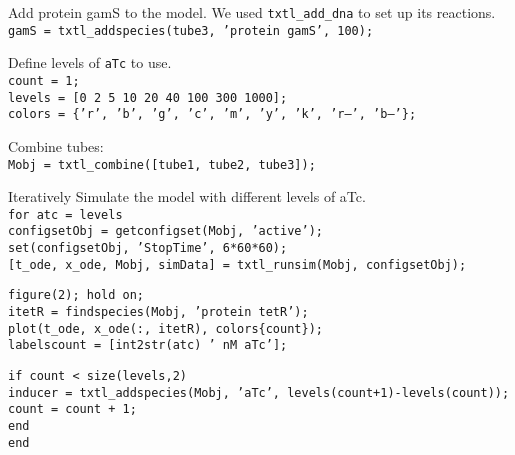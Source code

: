 		Add protein gamS to the model. We used \texttt{txtl\_add\_dna} to set up its reactions. \\
		
		\noindent \texttt{gamS = txtl\_addspecies(tube3, 'protein gamS', 100);}
\vspace*{1\baselineskip}
				
		Define levels of \texttt{aTc} to use. \\						
\noindent \texttt{count = 1;}\\
\texttt{levels = [0 2 5 10 20 40 100 300 1000];}\\
\texttt{colors = \{'r', 'b', 'g', 'c', 'm', 'y', 'k', 'r--', 'b--'\};}
\vspace*{1\baselineskip}
								
		Combine tubes: \\						
\noindent \texttt{Mobj = txtl\_combine([tube1, tube2, tube3]);}
\vspace*{1\baselineskip}
								
		Iteratively Simulate the model with different levels of aTc. \\						
\noindent \texttt{for atc = levels }\\
 \texttt{configsetObj = getconfigset(Mobj, 'active');}\\
  \texttt{set(configsetObj, 'StopTime', 6*60*60);  }\\
  \texttt{[t\_ode, x\_ode, Mobj, simData] = txtl\_runsim(Mobj, configsetObj); }
\vspace*{1\baselineskip}
								
\noindent \texttt{figure(2); hold on;}\\
  \texttt{itetR = findspecies(Mobj, 'protein tetR');}\\
  \texttt{plot(t\_ode, x\_ode(:, itetR), colors\{count\});}\\
  \texttt{labels{count} = [int2str(atc) ' nM aTc'];}
								\vspace*{1\baselineskip}
								
  \noindent \texttt{if count < size(levels,2)}\\
  \texttt{inducer = txtl\_addspecies(Mobj, 'aTc', levels(count+1)-levels(count));}\\
  \texttt{count = count + 1;}\\
  \texttt{end}\\
\texttt{end}
	\vspace*{1\baselineskip}
								
